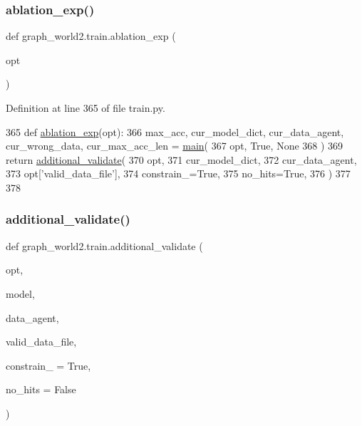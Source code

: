 \subsubsection{\texorpdfstring{ablation\+\_\+exp()}{ablation\_exp()}}
{\footnotesize\ttfamily def graph\+\_\+world2.\+train.\+ablation\+\_\+exp (\begin{DoxyParamCaption}\item[{}]{opt }\end{DoxyParamCaption})}



Definition at line 365 of file train.\+py.


\begin{DoxyCode}
365 \textcolor{keyword}{def }\hyperlink{namespacegraph__world2_1_1train_a4a2155646856189e143dbc828baef945}{ablation\_exp}(opt):
366     max\_acc, cur\_model\_dict, cur\_data\_agent, cur\_wrong\_data, cur\_max\_acc\_len = 
      \hyperlink{namespacegraph__world2_1_1train_af3dec887619817c1a7a38930ffcfd1cb}{main}(
367         opt, \textcolor{keyword}{True}, \textcolor{keywordtype}{None}
368     )
369     \textcolor{keywordflow}{return} \hyperlink{namespacegraph__world2_1_1train_aaff96a1b7f0cafac9dab96cbc02ae4d0}{additional\_validate}(
370         opt,
371         cur\_model\_dict,
372         cur\_data\_agent,
373         opt[\textcolor{stringliteral}{'valid\_data\_file'}],
374         constrain\_=\textcolor{keyword}{True},
375         no\_hits=\textcolor{keyword}{True},
376     )
377 
378 
\end{DoxyCode}
\mbox{\label{namespacegraph__world2_1_1train_aaff96a1b7f0cafac9dab96cbc02ae4d0}} 
\subsubsection{\texorpdfstring{additional\+\_\+validate()}{additional\_validate()}}
{\footnotesize\ttfamily def graph\+\_\+world2.\+train.\+additional\+\_\+validate (\begin{DoxyParamCaption}\item[{}]{opt,  }\item[{}]{model,  }\item[{}]{data\+\_\+agent,  }\item[{}]{valid\+\_\+data\+\_\+file,  }\item[{}]{constrain\+\_\+ = {\ttfamily True},  }\item[{}]{no\+\_\+hits = {\ttfamily False} }\end{DoxyParamCaption})}




